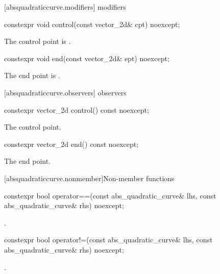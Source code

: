  [absquadraticcurve.modifiers]{ modifiers}%

%
\begin{itemdecl}
constexpr void control(const vector_2d& cpt) noexcept;
\end{itemdecl}
\begin{itemdescr}
\pnum
\effects
The control point is .
\end{itemdescr}

%
\begin{itemdecl}
constexpr void end(const vector_2d& ept) noexcept;
\end{itemdecl}
\begin{itemdescr}
\pnum
\effects
The end point is .
\end{itemdescr}

 [absquadraticcurve.observers]{ observers}%

%
\begin{itemdecl}
constexpr vector_2d control() const noexcept;
\end{itemdecl}
\begin{itemdescr}
\pnum
\returns
The control point.
\end{itemdescr}

%
\begin{itemdecl}
constexpr vector_2d end() const noexcept;
\end{itemdecl}
\begin{itemdescr}
\pnum
\returns
The end point.
\end{itemdescr}

 [absquadraticcurve.nonmember]{Non-member functions}%

%
\begin{itemdecl}
constexpr bool operator==(const abs_quadratic_curve& lhs,
  const abs_quadratic_curve& rhs) noexcept;
\end{itemdecl}
\begin{itemdescr}
\pnum
\returns
{}.
\end{itemdescr}

%
\begin{itemdecl}
constexpr bool operator!=(const abs_quadratic_curve& lhs,
  const abs_quadratic_curve& rhs) noexcept;
\end{itemdecl}
\begin{itemdescr}
\pnum
\returns
{}.
\end{itemdescr}
